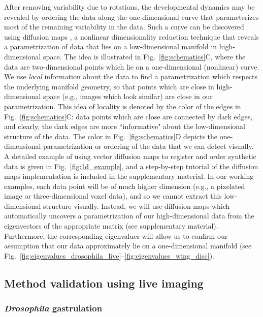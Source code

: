 \documentclass[twocolumn, 10pt]{article}
\newcommand{\SI}[0]{supplementary material}
\newcommand{\fig}[0]{Fig.}
\begin{document}
After removing variability due to rotations, the developmental dynamics may be revealed by ordering the data along the one-dimensional curve that parameterizes most of the remaining variability in the data.
%
Such a curve can be discovered using diffusion maps \citep{coifman2005geometric}, a nonlinear dimensionality reduction technique that reveals a parametrization of data that lies on a low-dimensional manifold in high-dimensional space.
%
The idea is illustrated in \fig~\ref{fig:schematics}C, where the data are two-dimensional points which lie on a one-dimensional (nonlinear) curve.
%
We use {\it local} information about the data to find a parametrization which respects the underlying manifold geometry, so that points which are close in high-dimensional space (e.g., images which look similar) are close in our parametrization.
%
This idea of locality is denoted by the color of the edges in \fig~\ref{fig:schematics}C:
data points which are close are connected by dark edges, and clearly, the dark edges are more ``informative" about the low-dimensional structure of the data.
%
The color in \fig~\ref{fig:schematics}D depicts the one-dimensional parametrization or ordering of the data that we can detect visually.
%
A detailed example of using vector diffusion maps to register and order synthetic data is given in \fig~\ref{fig:1d_example}, and a step-by-step tutorial of the diffusion maps implementation is included in the \SI.
%
In our working examples, each data point will be of much higher dimension (e.g., a pixelated image or three-dimensional voxel data), and so we cannot extract this low-dimensional structure visually.
%
Instead, we will use diffusion maps which automatically uncovers a parametrization of our high-dimensional data from the eigenvectors of the appropriate matrix (see \SI).
%
Furthermore, the corresponding eigenvalues will allow us to confirm our assumption that our data approximately lie on a one-dimensional manifold (see \fig~\ref{fig:eigenvalues_drosophila_live}--\ref{fig:eigenvalues_wing_disc}).
%


\subsection*{Method validation using live imaging}

\subsubsection*{{\em Drosophila} gastrulation}
\end{document}
